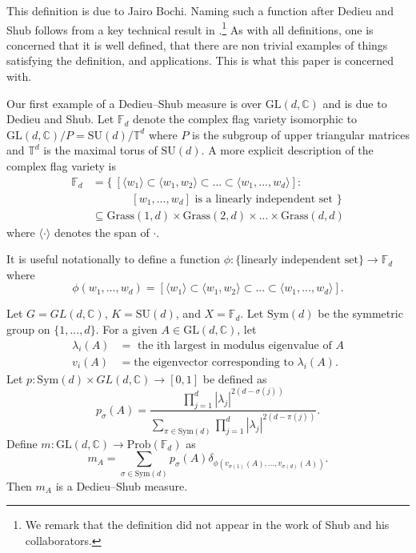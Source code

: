 \documentclass[10pt]{amsart}
\numberwithin{equation}{section}     %
\newcommand{\C}{\mathbb{C}}
\newcommand{\T}{\mathbb{T}}
\newcommand{\Sym}{\mathrm{Sym}}
\newcommand{\FF}{\mathbb{F}}
\newcommand{\GL}{\mathrm{GL}}
\newcommand{\SU}{\mathrm{SU}}
\newcommand{\Prob}{\mathrm{Prob}}
\begin{document}
This definition is due to Jairo Bochi. Naming such a function after Dedieu and Shub follows from a key technical result in \cite{dedieu2003mike}.\footnote{We remark that the definition did not appear in the work of Shub and his collaborators. } As with all definitions, one is concerned that it is well defined, that there are non trivial examples of things satisfying the definition, and applications. This is what this paper is concerned with. 

Our first example of a Dedieu--Shub measure is over $\GL(d,\C)$ and is due to Dedieu and Shub. Let $\FF_d$ denote the complex flag variety isomorphic to $\GL(d,\C)/P = \SU(d)/\T^d$ where $P$ is the subgroup of upper triangular matrices and $\T^d$ %
is the maximal torus of $\SU(d)$. A more explicit description of the complex flag variety is  
\begin{align*}
    \FF_d &= \{ \ [\langle w_1\rangle \subset \langle w_1,w_2\rangle  \subset ... \subset \langle w_1,...,w_d\rangle ] : \\ & \ \ \ \ \ \ \ \ \ \ \ \ \ \ \ \ [w_1,...,w_d] \text{ is a linearly independent set } \}\\
    &\subseteq \text{Grass}(1,d) \times \text{Grass}(2,d) \times ... \times \text{Grass}(d,d)
\end{align*}
where $\langle \cdot \rangle$ 
denotes the span of $\cdot.$  


 It is useful notationally to define a function $\phi: \{ \text{linearly independent set}\} \to \FF_d$ where $$\phi(w_1,...,w_d) = [\langle w_1 \rangle \subset \langle w_1, w_2 \rangle  \subset ... \subset \langle w_1, ..., w_d \rangle ].$$

\begin{theorem}
\label{DS measures}
Let $G = GL(d,\C)$, $K = \SU(d)$, and $X = \FF_d$.  Let $\Sym(d)$ be the symmetric group on $\{1,...,d\}$. For a given $A \in \GL(d,\C)$, let 
\begin{align*}
\lambda_i(A) &= \text{ the ith largest in modulus eigenvalue of } A\\
v_i(A) &= \text{the eigenvector corresponding to } \lambda_i(A).
\end{align*}
Let $p:\Sym(d) \times GL(d,\C) \to [0,1]$ be defined as $$p_\sigma(A) = \frac{\prod \limits_{j = 1}^d |\lambda_j|^{2(d - \sigma(j))}}{\sum \limits_{\pi \in \Sym(d)} \prod \limits_{j=1}^d |\lambda_j|^{2(d - \pi(j))}}.$$
Define $m: \GL(d,\C) \to \Prob(\FF_d)$ as $$m_A = \sum \limits_{\sigma \in \Sym(d)} p_\sigma(A) \delta_{\phi(v_{\sigma(1)}(A),...,v_{\sigma(d)}(A))}.$$
Then $m_A$ is a Dedieu--Shub measure. 
\end{theorem} 
\end{document}
